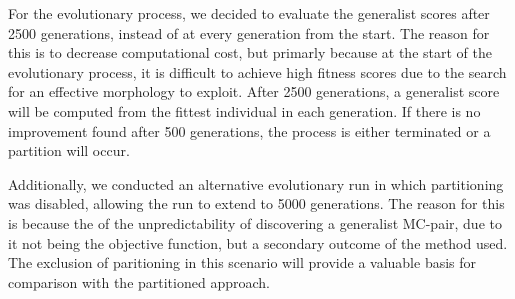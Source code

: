         For the evolutionary process, we decided to evaluate the generalist scores after 2500 generations, instead of at every generation from the start. The reason for this is to decrease computational cost, but primarly because at the start of the evolutionary process, it is difficult to achieve high fitness scores due to the search for an effective morphology to exploit. After 2500 generations, a generalist score will be computed from the fittest individual in each generation. If there is no improvement found after 500 generations, the process is either terminated or a partition will occur.

        Additionally, we conducted an alternative evolutionary run in which partitioning was disabled, allowing the run to extend to 5000 generations. The reason for this is because the of the unpredictability of discovering a generalist MC-pair, due to it not being the objective function, but a secondary outcome of the method used. The exclusion of paritioning in this scenario will provide a valuable basis for comparison with the partitioned approach.
